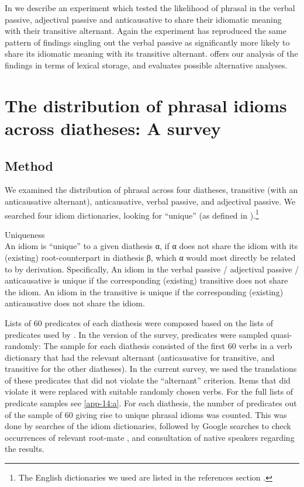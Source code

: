 \documentclass[output=paper]{langsci/langscibook}
\begin{document}
In  we describe an experiment which tested the likelihood of
phrasal  in the verbal passive, adjectival passive and anticausative to
share their idiomatic meaning with their transitive alternant. Again the
experiment has reproduced the same pattern of findings singling out the verbal
passive as significantly more likely to share its idiomatic meaning with its
transitive alternant.  offers our analysis of the findings
in terms of lexical storage, and  evaluates possible
alternative analyses.

\section{The distribution of phrasal idioms across diatheses: A
survey}\label{sec:key:20.2}

\subsection{Method} %

We examined the distribution of phrasal  across four diatheses,
transitive (with an anticausative alternant), anticausative, verbal passive,
and adjectival passive. We searched four  idiom dictionaries,
looking for ``unique''  (as defined in ).\footnote{The
English dictionaries we used are listed in the references section
\parencite[see][]{Ammer2013,White1998,Heacook2003,Spears2006}.}

\ea\label{ex:key:20.6} Uniqueness\\
    An idiom is ``unique'' to a given diathesis α, if α does not share the idiom
    with its (existing) root-counterpart in diathesis β, which α would most
    directly be related to by derivation.  Specifically,
    \ea An idiom in the verbal passive / adjectival passive / anticausative is
    unique if the corresponding (existing) transitive does not share the idiom.
    \ex An idiom in the transitive is unique if the corresponding (existing)
    anticausative does not share the idiom.
    \z
\z

Lists of 60 predicates of each diathesis were composed based on the lists of
predicates used by \citet{HorSil2009}. In the  version of
the survey, predicates were sampled quasi-randomly: The sample for each
diathesis consisted of the first 60 verbs in a verb dictionary that had the
relevant alternant (anticausative for transitive, and transitive for the other
diatheses). In the current survey, we used the  translations of
these predicates that did not violate the ``alternant'' criterion. Items that
did violate it were replaced with suitable randomly chosen  verbs. For
the full lists of predicate samples see \ref{app-14:a}. For each diathesis, the
number of predicates out of the sample of 60 giving rise to unique phrasal
idioms was counted. This was done by searches of the idiom dictionaries,
followed by Google searches to check occurrences of relevant root-mate ,
and consultation of native speakers regarding the results.
\end{document}
